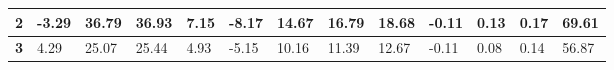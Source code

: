 \documentclass[10pt,a4paper]{article}
\begin{document}
\begin{table}[]
\begin{tabular}{|l|llll|llll|llll|}
\textbf{2}  & \multicolumn{1}{l|}{-3.29}                                                            & \multicolumn{1}{l|}{36.79}                                                             & \multicolumn{1}{l|}{36.93}                                                           & 7.15                                                                                             & \multicolumn{1}{l|}{-8.17}                                                            & \multicolumn{1}{l|}{14.67}                                                             & \multicolumn{1}{l|}{16.79}                                                           & 18.68                                                                                            & \multicolumn{1}{l|}{-0.11}                                                            & \multicolumn{1}{l|}{0.13}                                                              & \multicolumn{1}{l|}{0.17}                                                            & 69.61                                                                                            \\ \hline
\textbf{3}  & \multicolumn{1}{l|}{4.29}                                                             & \multicolumn{1}{l|}{25.07}                                                             & \multicolumn{1}{l|}{25.44}                                                           & 4.93                                                                                             & \multicolumn{1}{l|}{-5.15}                                                            & \multicolumn{1}{l|}{10.16}                                                             & \multicolumn{1}{l|}{11.39}                                                           & 12.67                                                                                            & \multicolumn{1}{l|}{{\color[HTML]{333333} -0.11}}                                     & \multicolumn{1}{l|}{{\color[HTML]{333333} 0.08}}                                       & \multicolumn{1}{l|}{{\color[HTML]{333333} 0.14}}                                     & {\color[HTML]{333333} 56.87}                                                                     \\ \hline

\end{tabular}
\end{table}
\end{document}
